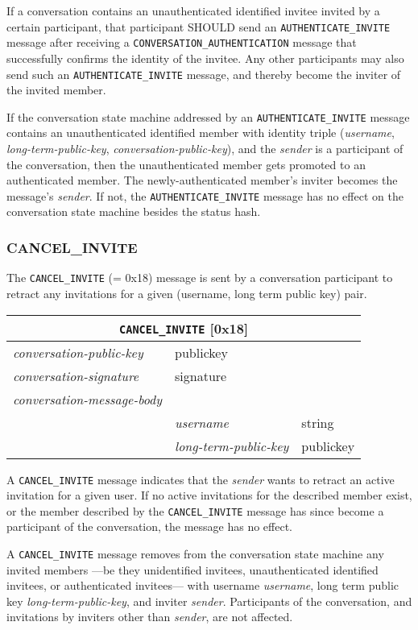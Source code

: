 \documentclass{article}
\def\message#1{\texttt{#1}}
\def\field#1{\textit{#1}}
\def\smfield#1{\textsf{#1}}
\newenvironment{conversationmessage}[2]{
\newcommand{\messagefield}[2]{
& \field{##1} & \textsf{##2} \\
\hline
}
\begin{tabular}{|l|l|l|}
\hline
\multicolumn{3}{|c|}{\message{#1} [#2]} \\
\hline
\hline
\field{conversation-public-key} & \multicolumn{2}{l|}{\textsf{publickey}} \\
\hline
\field{conversation-signature} & \multicolumn{2}{l|}{\textsf{signature}} \\
\hline
\field{conversation-message-body} & \multicolumn{2}{l|}{} \\
\hline
}{
\end{tabular}
}
\begin{document}
If a conversation contains an unauthenticated identified invitee invited by a certain participant, that participant SHOULD send an \message{AUTHENTICATE\_INVITE} message after receiving a \message{CONVERSATION\_AUTHENTICATION} message that successfully confirms the identity of the invitee.
Any other participants may also send such an \message{AUTHENTICATE\_INVITE} message, and thereby become the inviter of the invited member.

If the conversation state machine addressed by an \message{AUTHENTICATE\_INVITE} message contains an unauthenticated identified member with identity triple (\field{username}, \field{long-term-public-key}, \field{conversation-public-key}), and the \field{sender} is a participant of the conversation, then the unauthenticated member gets promoted to an authenticated member.
The newly-authenticated member's inviter becomes the message's \field{sender}.
If not, the \message{AUTHENTICATE\_INVITE} message has no effect on the conversation state machine besides the \smfield{status hash}.

\subsubsection{CANCEL\_INVITE}

The \message{CANCEL\_INVITE} (= 0x18) message is sent by a conversation participant to retract any invitations for a given (username, long term public key) pair.

\begin{conversationmessage}{CANCEL\_INVITE}{0x18}
\messagefield{username}{string}
\messagefield{long-term-public-key}{publickey}
\end{conversationmessage}

A \message{CANCEL\_INVITE} message indicates that the \field{sender} wants to retract an active invitation for a given user.
If no active invitations for the described member exist, or the member described by the \message{CANCEL\_INVITE} message has since become a participant of the conversation, the message has no effect.

A \message{CANCEL\_INVITE} message removes from the conversation state machine any invited members ---be they unidentified invitees, unauthenticated identified invitees, or authenticated invitees--- with username \field{username}, long term public key \field{long-term-public-key}, and inviter \field{sender}.
Participants of the conversation, and invitations by inviters other than \field{sender}, are not affected.
\end{document}
